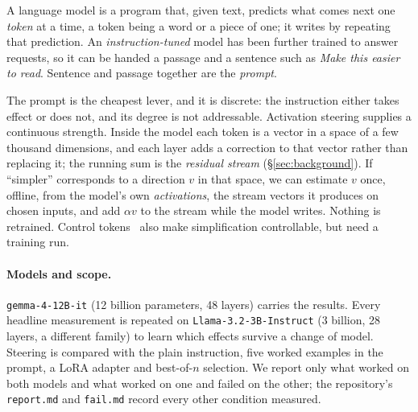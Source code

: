 \documentclass[aps,prb,reprint,nofootinbib,a4paper]{revtex4-2}
\newcommand{\code}[1]{\texttt{\small #1}}
\begin{document}
A language model is a program that, given text, predicts what comes next one
\emph{token} at a time, a token being a word or a piece of one; it writes by
repeating that prediction. An \emph{instruction-tuned} model has been further
trained to answer requests, so it can be handed a passage and a sentence such
as \emph{Make this easier to read}. Sentence and passage together are the
\emph{prompt}.

The prompt is the cheapest lever, and it is discrete: the instruction either
takes effect or does not, and its degree is not addressable. Activation
steering supplies a continuous strength. Inside the model each token is a
vector in a space of a few thousand dimensions, and each layer adds a
correction to that vector rather than replacing it; the running sum is the
\emph{residual stream} (\S\ref{sec:background}). If ``simpler'' corresponds to
a direction $v$ in that space, we can estimate $v$ once, offline, from the
model's own \emph{activations}, the stream vectors it produces on chosen
inputs, and add $\alpha v$ to the stream while the model writes. Nothing is
retrained. Control tokens~\cite{access,muss} also make simplification
controllable, but need a training run.

\paragraph{Models and scope.} \code{gemma-4-12B-it} (12 billion parameters, 48
layers) carries the results. Every headline measurement is repeated on
\code{Llama-3.2-3B-Instruct} (3 billion, 28 layers, a different family) to
learn which effects survive a change of model. Steering is compared with the
plain instruction, five worked examples in the prompt, a LoRA adapter and
best-of-$n$ selection. We report only what worked on both models and what
worked on one and failed on the other; the repository's \code{report.md} and
\code{fail.md} record every other condition measured.
\end{document}
